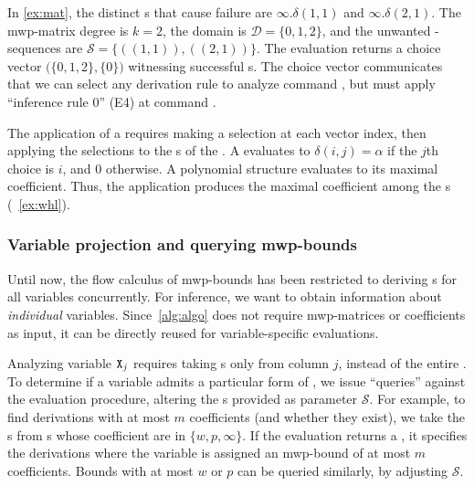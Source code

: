 \begin{example}\label{ex:derivable}
In \autoref{ex:mat}, the distinct s that cause failure are
\(\infty.\delta(1,1)\) and  \(\infty.\delta(2,1)\).
The mwp-matrix degree is \(k=2\), the domain is
\(\mathcal{D}=\{0,1,2\}\), and the unwanted -sequences are \(\mathcal{S} = \{ ((1,1)), ((2,1)) \}\). The
evaluation returns a choice vector \(\big(\{0,1,2\}, \{0\}\big)\) witnessing
successful s. The choice vector communicates that we can
select any derivation rule to analyze command , but must apply
\enquote{inference rule 0} (E4) at command .
\end{example}

The application of a  requires making a selection at each
vector index, then applying the selections to the s of
the . A  evaluates to \(\delta(i, j) =
\alpha\) if the \(j\)th choice is
\(i\), and \(0\) otherwise. A polynomial structure
evaluates to its maximal coefficient. Thus, the
application produces the maximal coefficient among the s
(\cf~\autoref{ex:whl}).

\subsubsection{Variable projection and querying mwp-bounds}
\label{subsec:query}

Until now, the flow calculus of mwp-bounds has been
restricted to deriving s for all variables concurrently. For
 inference, we want to obtain information about
\emph{individual} variables. Since~\autoref{alg:algo} does not require
mwp-matrices or coefficients as
input, it can be directly reused for variable-specific evaluations.

Analyzing variable \(\prm{X}_j\) requires taking s only from column \(j\), instead of the entire
. To determine if a variable admits a particular form of
, we issue \enquote{queries} against the evaluation procedure,
altering the s provided as parameter
\(\mathcal{S}\). For example, to find derivations with at most
\(m\) coefficients (and whether they exist), we take the
s from s whose coefficient are in \(\{w,
p,\infty\}\). If the evaluation returns a
, it specifies the derivations where the variable is assigned
an mwp-bound of at most \(m\) coefficients.
Bounds with at most \(w\) or \(p\) can be queried similarly,
by adjusting \(\mathcal{S}\).

